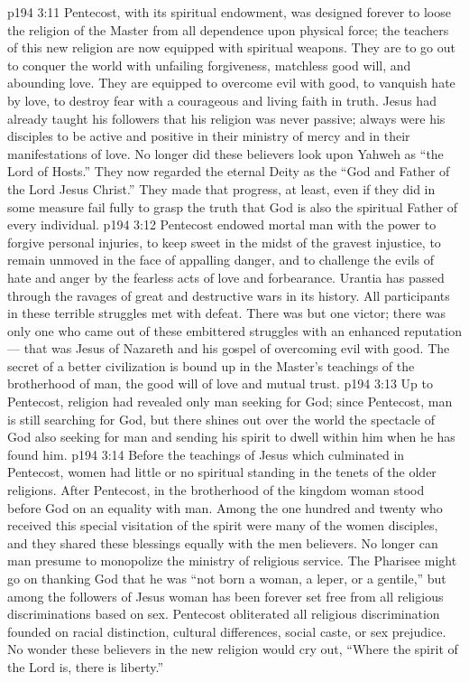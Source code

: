 \vs p194 3:11 \pc Pentecost, with its spiritual endowment, was designed forever to loose the religion of the Master from all dependence upon physical force; the teachers of this new religion are now equipped with spiritual weapons. They are to go out to conquer the world with unfailing forgiveness, matchless good will, and abounding love. They are equipped to overcome evil with good, to vanquish hate by love, to destroy fear with a courageous and living faith in truth. Jesus had already taught his followers that his religion was never passive; always were his disciples to be active and positive in their ministry of mercy and in their manifestations of love. No longer did these believers look upon Yahweh as “the Lord of Hosts.” They now regarded the eternal Deity as the “God and Father of the Lord Jesus Christ.” They made that progress, at least, even if they did in some measure fail fully to grasp the truth that God is also the spiritual Father of every individual.
\vs p194 3:12 Pentecost endowed mortal man with the power to forgive personal injuries, to keep sweet in the midst of the gravest injustice, to remain unmoved in the face of appalling danger, and to challenge the evils of hate and anger by the fearless acts of love and forbearance. Urantia has passed through the ravages of great and destructive wars in its history. All participants in these terrible struggles met with defeat. There was but one victor; there was only one who came out of these embittered struggles with an enhanced reputation --- that was Jesus of Nazareth and his gospel of overcoming evil with good. The secret of a better civilization is bound up in the Master’s teachings of the brotherhood of man, the good will of love and mutual trust.
\vs p194 3:13 Up to Pentecost, religion had revealed only man seeking for God; since Pentecost, man is still searching for God, but there shines out over the world the spectacle of God also seeking for man and sending his spirit to dwell within him when he has found him.
\vs p194 3:14 \pc Before the teachings of Jesus which culminated in Pentecost, women had little or no spiritual standing in the tenets of the older religions. After Pentecost, in the brotherhood of the kingdom woman stood before God on an equality with man. Among the one hundred and twenty who received this special visitation of the spirit were many of the women disciples, and they shared these blessings equally with the men believers. No longer can man presume to monopolize the ministry of religious service. The Pharisee might go on thanking God that he was “not born a woman, a leper, or a gentile,” but among the followers of Jesus woman has been forever set free from all religious discriminations based on sex. Pentecost obliterated all religious discrimination founded on racial distinction, cultural differences, social caste, or sex prejudice. No wonder these believers in the new religion would cry out, “Where the spirit of the Lord is, there is liberty.”
